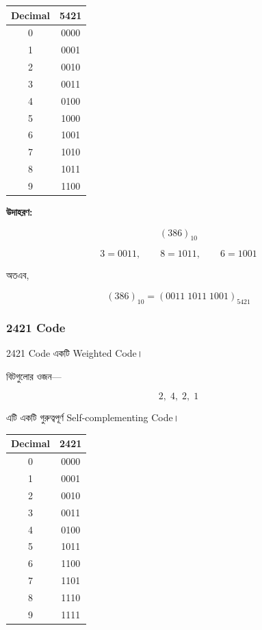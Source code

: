 \begin{center}
\begin{tabular}{|c|c|}
\hline
\rowcolor{ICTLightBlue}
\textbf{\textenglish{Decimal}} &
\textbf{\textenglish{5421}} \\
\hline
0 & 0000 \\ \hline
1 & 0001 \\ \hline
2 & 0010 \\ \hline
3 & 0011 \\ \hline
4 & 0100 \\ \hline
5 & 1000 \\ \hline
6 & 1001 \\ \hline
7 & 1010 \\ \hline
8 & 1011 \\ \hline
9 & 1100 \\ \hline
\end{tabular}
\end{center}

\textbf{\textcolor{ICTOrange}{উদাহরণ:}}

\[
(386)_{10}
\]

\[
3=0011,\qquad
8=1011,\qquad
6=1001
\]

অতএব,

\[
\boxed{
(386)_{10}
=
(0011\;1011\;1001)_{5421}
}
\]


\subsubsection*{\textenglish{2421 Code}}

\textenglish{2421 Code} একটি
\textenglish{Weighted Code}।

বিটগুলোর ওজন—

\[
\boxed{2,\;4,\;2,\;1}
\]

এটি একটি গুরুত্বপূর্ণ
\textenglish{Self-complementing Code}।

\begin{center}
\begin{tabular}{|c|c|}
\hline
\rowcolor{ICTLightBlue}
\textbf{\textenglish{Decimal}} &
\textbf{\textenglish{2421}} \\
\hline
0 & 0000 \\ \hline
1 & 0001 \\ \hline
2 & 0010 \\ \hline
3 & 0011 \\ \hline
4 & 0100 \\ \hline
5 & 1011 \\ \hline
6 & 1100 \\ \hline
7 & 1101 \\ \hline
8 & 1110 \\ \hline
9 & 1111 \\ \hline
\end{tabular}
\end{center}

